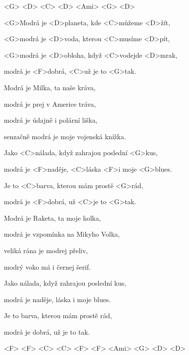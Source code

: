 

<G> <D> <C> <D> <Ami> <G> <D>

\zs
<G>Modrá je <D>planeta, kde <C>můžeme <D>žít,

<G>modrá je <D>voda, kterou <C>musíme <D>pít,

<G>modrá je <D>obloha, když <C>vodejde <D>mrak,

modrá je <F>dobrá, <C>už je to <G>tak.
\ks

\zs
Modrá je Milka, ta naše kráva,

modrá je prej v Americe tráva,

modrá je údajně i polární liška,

senzačně modrá je moje vojenská knížka.
\ks

\zr
Jako <C>nálada, když zahrajou poslední <G>kus,

modrá je <F>naděje, <C>láska <F>i moje <G>blues.

Je to <C>barva, kterou mám prostě <G>rád,

modrá je <F>dobrá, už <C>je to <G>tak.
\kr

\zs
Modrá je Raketa, ta moje holka,

modrá je vzpomínka na Mikyho Volka,

veliká rána je modrej přeliv,

modrý voko má i černej šerif.
\ks

\zs
Jako nálada, když zahrajou poslední kus,

modrá je naděje, láska i moje blues.

Je to barva, kterou mám prostě rád,

modrá je dobrá, už je to tak.
\ks

<F> <F> <C> <C> <F> <F> <Ami> <G> <D> <D>

\kp





